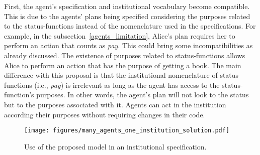 \documentclass[runningheads]{llncs}
\begin{document}
First, the agent's specification and institutional vocabulary become compatible. This is due to the agents' plans being specified considering the purposes related to the status-functions instead of the nomenclature used in the specifications. For example, in the subsection~\ref{agents_limitation}, Alice's plan requires her to perform an action that counts as \emph{pay}. This could bring some incompatibilities as already discussed. The existence of purposes related to status-functions allows Alice to perform an action that has the purpose of getting a book. The main difference with this proposal is that the institutional nomenclature of status-functions (i.e., \emph{pay}) is irrelevant as long as the agent has access to the status-function's purposes. In other words, the agent's plan will not look to the status but to the purposes associated with it.
Agents can act in the institution according their purposes without requiring changes in their code.



\begin{figure*}[!ht]\centering %
	\texttt{[image: figures/many\_agents\_one\_institution\_solution.pdf]}
	\caption{Use of the proposed model in an institutional specification.}
	\label{fig:many_agents_one_institution_solution}
\end{figure*}


\end{document}
